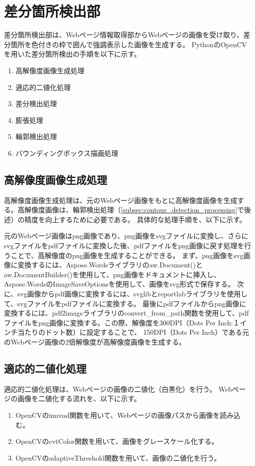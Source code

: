 \section{差分箇所検出部}\label{sec:Difference_extraction_section}
差分箇所検出部は、Webページ情報取得部からWebページの画像を受け取り、差分箇所を色付きの枠で囲んで強調表示した画像を生成する。
PythonのOpenCV\cite{OpenCV}を用いた差分箇所検出の手順を以下に示す。
\begin{enumerate}
    \item 高解像度画像生成処理
    \item 適応的二値化処理
    \item 差分検出処理
    \item 膨張処理
    \item 輪郭検出処理
    \item バウンディングボックス描画処理
\end{enumerate}

\subsection{高解像度画像生成処理}\label{subsec:Generate_high_images}
高解像度画像生成処理は、元のWebページ画像をもとに高解像度画像を生成する。高解像度画像は、輪郭検出処理（\ref{subsec:contour_detection_processing}で後述）の精度を向上するために必要である。
具体的な処理手順を、以下に示す。

元のWebページ画像はpng画像であり、png画像をsvgファイルに変換し、さらにsvgファイルをpdfファイルに変換した後、pdfファイルをpng画像に戻す処理を行うことで、高解像度のpng画像を生成することができる。
まず、png画像をsvg画像に変換するには、Aspose.Wordsライブラリのaw.Document()とaw.DocumentBuilder()を使用して、png画像をドキュメントに挿入し、Aspose.WordsのImageSaveOptionsを使用して、画像をsvg形式で保存する。
次に、svg画像からpdf画像に変換するには、svglibとreportlabライブラリを使用して、svgファイルをpdfファイルに変換する。
最後にpdfファイルからpng画像に変換するには、pdf2imageライブラリのconvert\_from\_path関数を使用して、pdfファイルをpng画像に変換する。この際、解像度を300DPI（Dots Per Inch:１インチ当たりのドット数）に設定することで、
150DPI（Dots Per Inch）である元のWebページ画像の2倍解像度が高解像度画像を生成する。


\subsection{適応的二値化処理}\label{subsec:Adaptive_Binarisation}
適応的二値化処理は、Webページの画像の二値化（白黒化）を行う。
Webページの画像を二値化する流れを、以下に示す。
\begin{enumerate}
    \item OpenCVのimread関数を用いて、Webページの画像パスから画像を読み込む。
    \item OpenCVのcvtColor関数を用いて、画像をグレースケール化する。
    \item OpenCVのadaptiveThreshold関数を用いて、画像の二値化を行う。
\end{enumerate}

